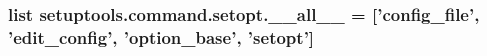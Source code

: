 \subsubsection[{\+\_\+\+\_\+all\+\_\+\+\_\+}]{\setlength{\rightskip}{0pt plus 5cm}list setuptools.\+command.\+setopt.\+\_\+\+\_\+all\+\_\+\+\_\+ = \mbox{[}'{\bf config\+\_\+file}', '{\bf edit\+\_\+config}', '{\bf option\+\_\+base}', '{\bf setopt}'\mbox{]}}\label{namespacesetuptools_1_1command_1_1setopt_a3cf4762e8e8fb05dbb87ac63f822f9da}

